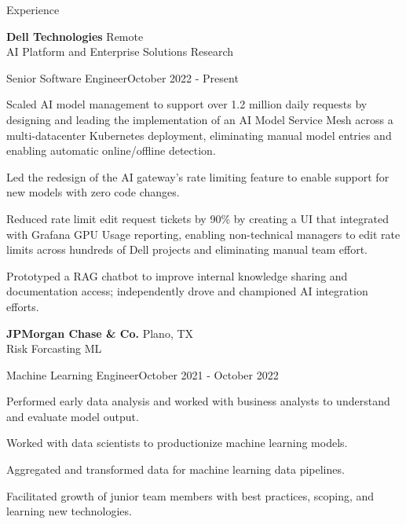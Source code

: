 \documentclass[
	10pt, %
]{resume} %
\begin{document}

\begin{rSection}{Experience}

    \textbf{Dell Technologies} \hfill {Remote} \\ 
    AI Platform and Enterprise Solutions Research
    
    \begin{rSubsection}{Senior Software Engineer}{October 2022 - Present}{}{}
        \item Scaled AI model management to support over 1.2 million daily requests by designing and leading the implementation of an AI Model Service Mesh across a multi-datacenter Kubernetes deployment, eliminating manual model entries and enabling automatic online/offline detection.
        \item Led the redesign of the AI gateway's rate limiting feature to enable support for new models with zero code changes.
        \item Reduced rate limit edit request tickets by 90\% by creating a UI that integrated with Grafana GPU Usage reporting, enabling non-technical managers to edit rate limits across hundreds of Dell projects and eliminating manual team effort.
        \item Prototyped a RAG chatbot to improve internal knowledge sharing and documentation access; independently drove and championed AI integration efforts.
	\end{rSubsection}


    \textbf{JPMorgan Chase \& Co.} \hfill {Plano, TX} \\ 
    Risk Forcasting ML
    
    \begin{rSubsection}{Machine Learning Engineer}{October 2021 - October 2022}{}{}
		\item Performed early data analysis and worked with business analysts to understand and evaluate model
output.
		\item Worked with data scientists to productionize machine learning models.
		\item Aggregated and transformed data for machine learning data pipelines.
		\item Facilitated growth of junior team members with best practices, scoping, and learning new technologies.
	\end{rSubsection}


\end{rSection}
\end{document}

